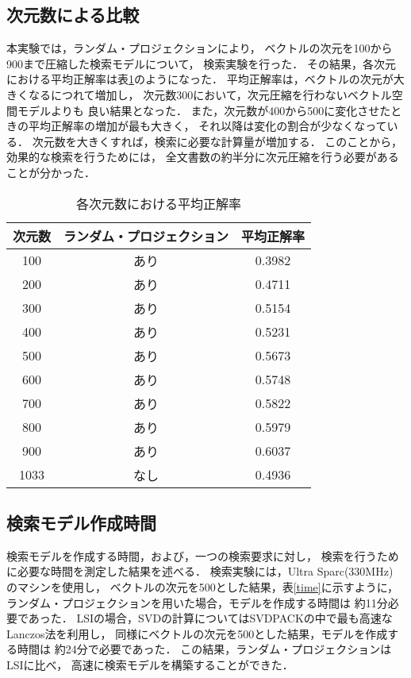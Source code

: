 \subsection{次元数による比較}
本実験では，ランダム・プロジェクションにより，
ベクトルの次元を100から900まで圧縮した検索モデルについて，
検索実験を行った．
その結果，各次元における平均正解率は表\ref{pre_sys}のようになった．
平均正解率は，ベクトルの次元が大きくなるにつれて増加し，
次元数300において，次元圧縮を行わないベクトル空間モデルよりも
良い結果となった．
また，次元数が400から500に変化させたときの平均正解率の増加が最も大きく，
それ以降は変化の割合が少なくなっている．
次元数を大きくすれば，検索に必要な計算量が増加する．
このことから，効果的な検索を行うためには，
全文書数の約半分に次元圧縮を行う必要があることが分かった．
\begin{table} \caption{各次元数における平均正解率} 
\label{pre_sys}
\renewcommand{\arraystretch}{}
\centering
\begin{tabular}{c|c|c} \hline \hline
次元数 & ランダム・プロジェクション & 平均正解率 \\ \hline
100 & あり & 0.3982 \\
200 & あり & 0.4711 \\
300 & あり & 0.5154 \\
400 & あり & 0.5231 \\
500 & あり & 0.5673 \\
600 & あり & 0.5748 \\
700 & あり & 0.5822 \\
800 & あり & 0.5979 \\
900 & あり & 0.6037 \\ \hline
1033 & なし & 0.4936 \\ \hline
\end{tabular}
\end{table}

\subsection{検索モデル作成時間}
検索モデルを作成する時間，および，一つの検索要求に対し，
検索を行うために必要な時間を測定した結果を述べる．
検索実験には，Ultra Sparc(330MHz) のマシンを使用し，
ベクトルの次元を500とした結果，表\ref{time}に示すように，
ランダム・プロジェクションを用いた場合，モデルを作成する時間は
約11分必要であった．
LSIの場合，SVDの計算についてはSVDPACKの中で最も高速なLanczos法を利用し，
同様にベクトルの次元を500とした結果，モデルを作成する時間は
約24分で必要であった．
この結果，ランダム・プロジェクションはLSIに比べ，
高速に検索モデルを構築することができた．

